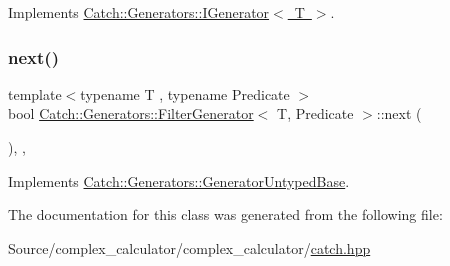 Implements \mbox{\hyperlink{struct_catch_1_1_generators_1_1_i_generator_a525d381fc9249a885b075a0632a8579a}{Catch\+::\+Generators\+::\+I\+Generator$<$ T $>$}}.

\mbox{\label{class_catch_1_1_generators_1_1_filter_generator_a02ce0839dcaa7545c55d0fe70cc50e84}} 
\subsubsection{\texorpdfstring{next()}{next()}}
{\footnotesize\ttfamily template$<$typename T , typename Predicate $>$ \\
bool \mbox{\hyperlink{class_catch_1_1_generators_1_1_filter_generator}{Catch\+::\+Generators\+::\+Filter\+Generator}}$<$ T, Predicate $>$\+::next (\begin{DoxyParamCaption}{ }\end{DoxyParamCaption})\hspace{0.3cm}{\ttfamily [inline]}, {\ttfamily [override]}, {\ttfamily [virtual]}}



Implements \mbox{\hyperlink{class_catch_1_1_generators_1_1_generator_untyped_base_aeed3c0cd6233c5f553549e453b8d6638}{Catch\+::\+Generators\+::\+Generator\+Untyped\+Base}}.



The documentation for this class was generated from the following file\+:\begin{DoxyCompactItemize}
\item 
Source/complex\+\_\+calculator/complex\+\_\+calculator/\mbox{\hyperlink{catch_8hpp}{catch.\+hpp}}\end{DoxyCompactItemize}
